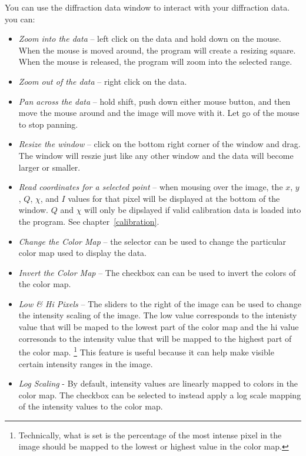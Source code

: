 You can use the diffraction data window to interact with your 
diffraction data. you can:
\begin{itemize}
    \item {\em Zoom into the data} -- left click on the data and 
    hold down on the mouse. When the mouse is moved around, the
    program will create a resizing square.  When the mouse is released,
    the program will zoom into the selected range.
    \item {\em Zoom out of the data} -- right click on
    the data.
    \item {\em Pan across the data} -- hold shift, push down either mouse
    button, and then move the mouse around and the image will move 
    with it. Let go of the mouse to stop panning.
    \item {\em Resize the window} -- click on the bottom right corner of
    the window and drag. The window will reszie just like any
    other window and the data will become larger or smaller.  
    \item {\em Read coordinates for a selected point} -- when mousing
    over the image, the $x$, $y$, $Q$, $\chi$, and $I$
    values for that pixel will be displayed at the bottom of the
    window. $Q$ and $\chi$ will only be dipslayed if valid calibration
    data is loaded into the program. See chapter~\ref{calibration}.
    \item {\em Change the Color Map} -- the  selector 
    can be used to change the particular color map used to display the 
    data.
    \item {\em Invert the Color Map} -- The  checkbox can 
    can be used to invert the colors of the color map.
    \item {\em Low \& Hi Pixels} -- The sliders to the right of the 
    image can be used to change the intensity scaling of the
    image. The low value corresponds to the intenisty 
    value that will be maped to the lowest part of
    the color map and the hi value corresonds to the intensity
    value that will be mapped to the highest part of the color
    map. \footnote{Technically, what is set is the
    percentage of the most intense pixel in the image should be 
    mapped to the lowest or highest value in the color map.}
    This feature is useful because it can help make visible certain
    intensity ranges in the image.
    \item {\em Log Scaling} - By default, intensity values are linearly 
    mapped to colors in the color map. The  checkbox 
    can be selected to instead apply a log scale mapping of the intensity 
    values to the color map.
\end{itemize}

